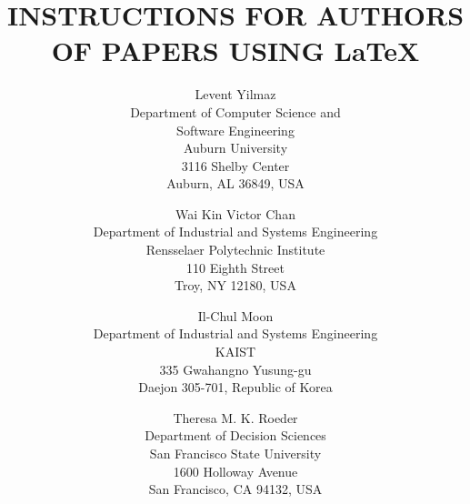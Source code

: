 \documentclass{wscpaperproc}
\theoremstyle{wsc}
\begin{document}
%
%

\title{INSTRUCTIONS FOR AUTHORS OF PAPERS USING \LaTeX}

\author{Levent Yilmaz\\ [12pt]
Department of Computer Science and \\ Software Engineering\\
Auburn University \\
3116 Shelby Center\\
Auburn, AL 36849, USA\\
\and
Wai Kin Victor Chan\\[12pt]
Department of Industrial and Systems Engineering \\
Rensselaer Polytechnic Institute\\
110 Eighth Street\\
Troy, NY 12180, USA \\
\and
Il-Chul Moon\\ [12pt]
Department of Industrial and Systems Engineering\\
KAIST\\
335 Gwahangno Yusung-gu\\
Daejon 305-701, Republic of Korea
\\
\and
Theresa M. K. Roeder\\ [12pt]
Department of Decision Sciences \\
San Francisco State University\\
1600 Holloway Avenue\\
San Francisco, CA 94132, USA
}






\maketitle
\end{document}
